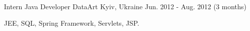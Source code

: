 \begin{cventries}
  \cventry
    {Intern Java Developer} %
    {DataArt} %
    {Kyiv, Ukraine} %
    {Jun. 2012 - Aug. 2012 (3 months)} %
    {
      \begin{cvitems} %
        \item {JEE, SQL, Spring Framework, Servlets, JSP.}
      \end{cvitems}
    }

\end{cventries}

